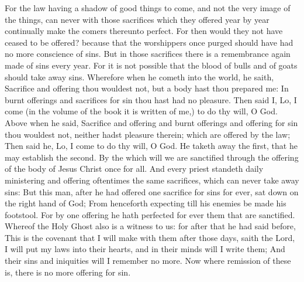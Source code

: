  For the law having a shadow of good things to come, and
not the very image of the things, can never with those sacrifices which
they offered year by year continually make the comers thereunto perfect.
 For then would they not have ceased to be offered?
because that the worshippers once purged should have had no more
conscience of sins.  But in those sacrifices there is a
remembrance again made of sins every year.  For it is not
possible that the blood of bulls and of goats should take away sins.
 Wherefore when he cometh into the world, he saith,
Sacrifice and offering thou wouldest not, but a body hast thou prepared
me:  In burnt offerings and sacrifices for sin thou hast
had no pleasure.  Then said I, Lo, I come (in the volume
of the book it is written of me,) to do thy will, O God. 
Above when he said, Sacrifice and offering and burnt offerings and
offering for sin thou wouldest not, neither hadst pleasure therein;
which are offered by the law;  Then said he, Lo, I come to
do thy will, O God. He taketh away the first, that he may establish the
second.  By the which will we are sanctified through the
offering of the body of Jesus Christ once for all.  And
every priest standeth daily ministering and offering oftentimes the same
sacrifices, which can never take away sins:  But this
man, after he had offered one sacrifice for sins for ever, sat down on
the right hand of God;  From henceforth expecting till
his enemies be made his footstool.  For by one offering
he hath perfected for ever them that are sanctified. 
Whereof the Holy Ghost also is a witness to us: for after that he had
said before,  This is the covenant that I will make with
them after those days, saith the Lord, I will put my laws into their
hearts, and in their minds will I write them;  And their
sins and iniquities will I remember no more.  Now where
remission of these is, there is no more offering for sin.


